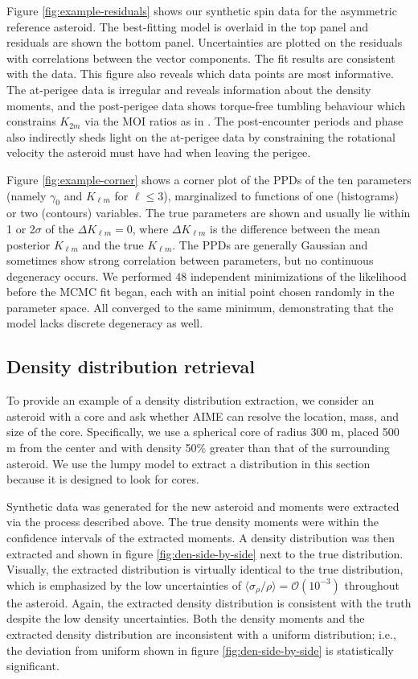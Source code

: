 \documentclass[fleqn,usenatbib]{mnras}
\begin{document}
Figure \ref{fig:example-residuals} shows our synthetic spin data for the asymmetric reference asteroid. The best-fitting model is overlaid in the top panel and residuals are shown the bottom panel. Uncertainties are plotted on the residuals with correlations between the vector components. The fit results are consistent with the data. This figure also reveals which data points are most informative. The at-perigee data is irregular and reveals information about the density moments, and the post-perigee data shows torque-free tumbling behaviour which constrains $K_{2m}$ via the MOI ratios as in \cite{MOSKOVITZ2020113519}. The post-encounter periods and phase also indirectly sheds light on the at-perigee data by constraining the rotational velocity the asteroid must have had when leaving the perigee.

Figure \ref{fig:example-corner} shows a corner plot of the PPDs of the ten parameters (namely $\gamma_0$ and $K_{\ell m}$ for $\ell \leq 3$), marginalized to functions of one (histograms) or two (contours) variables. The true parameters are shown and usually lie within 1 or 2$\sigma$ of the $\Delta K_{\ell m} = 0$, where $\Delta K_{\ell m}$ is the difference between the mean posterior $K_{\ell m}$ and the true $K_{\ell m}$. The PPDs are generally Gaussian and sometimes show strong correlation between parameters, but no continuous degeneracy occurs. We performed 48 independent minimizations of the likelihood before the MCMC fit began, each with an initial point chosen randomly in the parameter space. All converged to the same minimum, demonstrating that the model lacks discrete degeneracy as well.


\subsection{Density distribution retrieval}
\label{sec:results-distro}

To provide an example of a density distribution extraction, we consider an asteroid with a core and ask whether AIME can resolve the location, mass, and size of the core. Specifically, we use a spherical core of radius 300 m, placed 500 m from the center and with density 50\% greater than that of the surrounding asteroid. We use the lumpy model to extract a distribution in this section because it is designed to look for cores.

Synthetic data was generated for the new asteroid and moments were extracted via the process described above. The true density moments were within the confidence intervals of the extracted moments. A density distribution was then extracted and shown in figure \ref{fig:den-side-by-side} next to the true distribution. Visually, the extracted distribution is virtually identical to the true distribution, which is emphasized by the low uncertainties of $\langle \sigma_\rho / \rho \rangle = \mathcal{O}(10^{-3})$ throughout the asteroid. Again, the extracted density distribution is consistent with the truth despite the low density uncertainties. Both the density moments and the extracted density distribution are inconsistent with a uniform distribution; i.e., the deviation from uniform shown in figure \ref{fig:den-side-by-side} is statistically significant.
\end{document}
